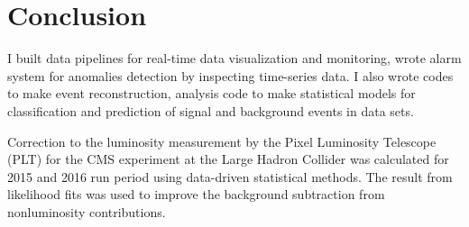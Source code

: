 \section{Conclusion}


I built data pipelines for real-time data visualization and monitoring, wrote alarm system for anomalies detection by inspecting time-series data. I also wrote codes to make event reconstruction, analysis code to make statistical models for classification and prediction of  signal and background events in data sets.

Correction to the luminosity measurement by the Pixel Luminosity Telescope (PLT) for the CMS experiment at the Large Hadron Collider was calculated for 2015 and 2016 run period using data-driven statistical methods. The result from likelihood fits was used to improve the background subtraction from nonluminosity contributions.
